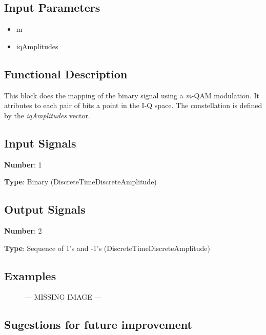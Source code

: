 \documentclass[../../sdf/tex/BPSK_system.tex]{subfiles}
\date{}
\begin{document}
\onlyinsubfile{\maketitle}
	

\subsection*{Input Parameters}

\begin{itemize}
	\item m 
	\item iqAmplitudes 
\end{itemize}

\subsection*{Functional Description}

This block does the mapping of the binary signal using a \textit{m}-QAM modulation. It atributes to each pair of bits a point in the I-Q space. The constellation is defined by the \textit{iqAmplitudes} vector.

\subsection*{Input Signals}

\textbf{Number}: 1

\textbf{Type}: Binary (DiscreteTimeDiscreteAmplitude)

\subsection*{Output Signals}

\textbf{Number}: 2

\textbf{Type}: Sequence of 1's and -1's (DiscreteTimeDiscreteAmplitude)

\subsection*{Examples}

\begin{figure}[h]
    --- MISSING IMAGE ---
\end{figure}

\subsection*{Sugestions for future improvement}
\end{document}
